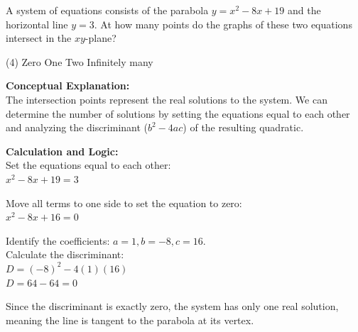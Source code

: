 \documentclass[11pt,paper=a4,answers]{exam}
\begin{document}
\begin{questions}
\pointsinrightmargin
\pointsdroppedatright
\marksnotpoints
{}
\pointformat{\boldmath\themarginpoints}
\bracketedpoints

\question
A system of equations consists of the parabola $y = x^2 - 8x + 19$ and the horizontal line $y = 3$. At how many points do the graphs of these two equations intersect in the $xy$-plane?
\begin{tasks}(4)
    \task Zero
    \task One
    \task Two
    \task Infinitely many
\end{tasks}

\begin{solution}
\textbf{Conceptual Explanation:} \\
The intersection points represent the real solutions to the system. We can determine the number of solutions by setting the equations equal to each other and analyzing the discriminant ($b^2 - 4ac$) of the resulting quadratic.

\vspace{20pt}

\textbf{Calculation and Logic:} \\
Set the equations equal to each other: \\
$x^2 - 8x + 19 = 3$

\vspace{10pt}

Move all terms to one side to set the equation to zero: \\
$x^2 - 8x + 16 = 0$

\vspace{10pt}

Identify the coefficients: $a = 1, b = -8, c = 16$. \\
Calculate the discriminant: \\
$D = (-8)^2 - 4(1)(16)$ \\
$D = 64 - 64 = 0$

\vspace{10pt}

Since the discriminant is exactly zero, the system has only one real solution, meaning the line is tangent to the parabola at its vertex.

\vspace{25pt}


\end{solution}
\end{questions}
\end{document}
